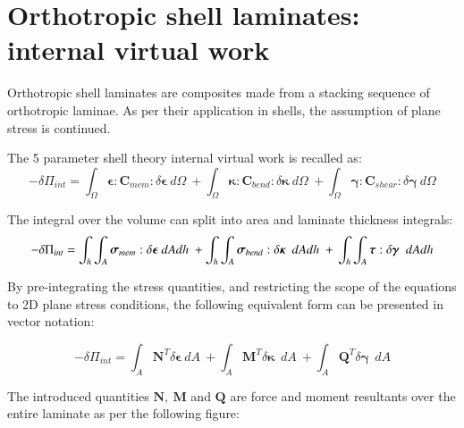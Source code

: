 \section{Orthotropic shell laminates: internal virtual work}

Orthotropic shell laminates are composites made from a stacking sequence of orthotropic laminae. As per their application in shells, the assumption of plane stress is continued.

The 5 parameter shell theory internal virtual work is recalled as:
\begin{equation} 
-\delta\Pi_{int} =
\int_\Omega
\boldsymbol{\epsilon}
:
\mathbf{C}_{mem}
:
\delta \boldsymbol{\epsilon}\ d \Omega\ 
+
\int_\Omega
\boldsymbol{\kappa}
:
\mathbf{C}_{bend}
:
\delta \boldsymbol{\kappa}\ 
d \Omega\ 
+
\int_\Omega
\boldsymbol{\gamma}
:
\mathbf{C}_{shear}
:
\delta \boldsymbol{\gamma}\ 
d \Omega
\label{eqsrm4_in_composite1}
\end{equation}

The integral over the volume can split into area and laminate thickness integrals:
\begin{equation} 
-\delta\Pi_{int} =
\int_h
\int_A
\boldsymbol{\sigma}_{mem}
:
\delta \boldsymbol{\epsilon}\ dAdh\ 
+
\int_h
\int_A
\boldsymbol{\sigma}_{bend}
:
\delta \boldsymbol{\kappa}\ 
\ dAdh\ 
+\\
\int_h
\int_A
\boldsymbol{\tau}
:
\delta \boldsymbol{\gamma}\ 
\ dAdh
\label{eqsrm4_in_composite2}
\end{equation}

By pre-integrating the stress quantities, and restricting the scope of the equations to 2D plane stress conditions, the following equivalent form can be presented in vector notation:

\begin{equation} 
-\delta\Pi_{int} =
\int_A
\mathbf{N}^T
\delta \boldsymbol{\epsilon}
\ dA\ 
+
\int_A
\mathbf{M}^T
\delta \boldsymbol{\kappa}\ 
\ dA\ 
+
\int_A
\mathbf{Q}^T
\delta \boldsymbol{\gamma}\ 
\ dA
\label{eqsrm4_in_composite3}
\end{equation}

The introduced quantities $\mathbf{N,\ M}$ and $\mathbf{Q}$ are force and moment resultants over the entire laminate as per the following figure:

